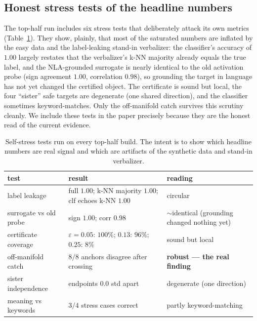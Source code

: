 \subsection{Honest stress tests of the headline numbers}

The top-half run includes six stress tests that deliberately attack its own metrics
(Table~\ref{tab:stress}). They show, plainly, that most of the saturated numbers are
inflated by the easy data and the label-leaking stand-in verbalizer: the
classifier's accuracy of $1.00$ largely restates that the verbalizer's k-NN majority
already equals the true label, and the NLA-grounded surrogate is nearly identical to
the old activation probe (sign agreement $1.00$, correlation $0.98$), so grounding
the target in language has not yet changed the certified object. The certificate is
sound but local, the four ``sister'' safe targets are degenerate (one shared
direction), and the classifier sometimes keyword-matches. Only the off-manifold
catch survives this scrutiny cleanly. We include these tests in the paper precisely
because they are the honest read of the current evidence.

\begin{table}[t]
\centering
\caption{Self-stress tests run on every top-half build. The intent is to show which
headline numbers are real signal and which are artifacts of the synthetic data and
stand-in verbalizer.}
\label{tab:stress}
\small
\begin{tabular}{@{}p{3.0cm}p{5.2cm}p{4.4cm}@{}}
\toprule
\textbf{test} & \textbf{result} & \textbf{reading} \\
\midrule
label leakage & full $1.00$; k-NN majority $1.00$; clf echoes k-NN $1.00$ & circular \\
surrogate vs old probe & sign $1.00$; corr $0.98$ & $\sim$identical (grounding changed nothing yet) \\
certificate coverage & $\varepsilon{=}0.05$: $100\%$; $0.13$: $96\%$; $0.25$: $8\%$ & sound but local \\
off-manifold catch & $8/8$ anchors disagree after crossing & \textbf{robust --- the real finding} \\
sister independence & endpoints $0.0$ std apart & degenerate (one direction) \\
meaning vs keywords & $3/4$ stress cases correct & partly keyword-matching \\
\bottomrule
\end{tabular}
\end{table}


